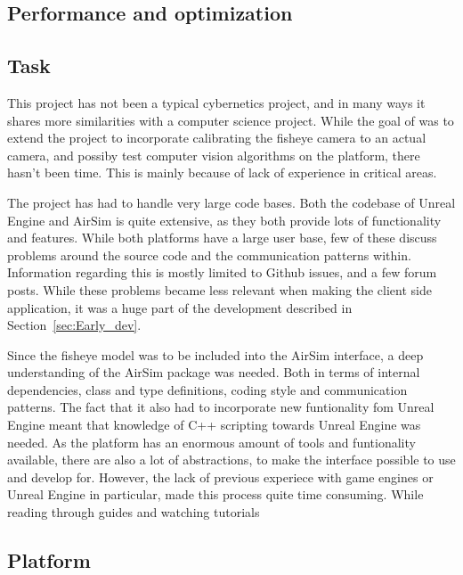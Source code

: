 
\subsection{Performance and optimization}

\subsection{Task}

This project has not been a typical cybernetics project, and in many ways it shares more similarities with a computer science project. While the goal of was to extend the project to incorporate calibrating the fisheye camera to an actual camera, and possiby test computer vision algorithms on the platform, there hasn't been time. This is mainly because of lack of experience in critical areas. 

The project has had to handle very large code bases. Both the codebase of Unreal Engine and AirSim is quite extensive, as they both provide lots of functionality and features. While both platforms have a large user base, few of these discuss problems around the source code and the communication patterns within. Information regarding this is mostly limited to Github issues, and a few forum posts. While these problems became less relevant when making the client side application, it was a huge part of the development described in Section~\ref{sec:Early_dev}. 

Since the fisheye model was to be included into the AirSim interface, a deep understanding of the AirSim package was needed. Both in terms of internal dependencies, class and type definitions, coding style and communication patterns. The fact that it also had to incorporate new funtionality fom Unreal Engine meant that knowledge of C++ scripting towards Unreal Engine was needed. As the platform has an enormous amount of tools and funtionality available, there are also a lot of abstractions, to make the interface possible to use and develop for. However, the lack of previous experiece with game engines or Unreal Engine in particular, made this process quite time consuming. While reading through guides and watching tutorials

\subsection{Platform}



